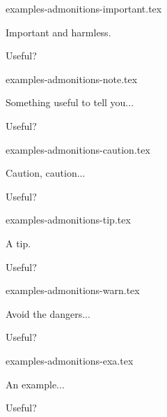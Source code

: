 \begin{filecontents*}[overwrite]{examples-admonitions-important.tex}
\begin{tdocimp}
    Important and harmless.
\end{tdocimp}

\begin{tdocimp}
    Useful?
\end{tdocimp}
\end{filecontents*}


\begin{filecontents*}[overwrite]{examples-admonitions-note.tex}
\begin{tdocnote}
    Something useful to tell you...
\end{tdocnote}

\begin{tdocnote}
    Useful?
\end{tdocnote}
\end{filecontents*}


\begin{filecontents*}[overwrite]{examples-admonitions-caution.tex}
\begin{tdoccaut}
    Caution, caution...
\end{tdoccaut}

\begin{tdoccaut}
    Useful?
\end{tdoccaut}
\end{filecontents*}


\begin{filecontents*}[overwrite]{examples-admonitions-tip.tex}
\begin{tdoctip}
    A tip.
\end{tdoctip}

\begin{tdoctip}
    Useful?
\end{tdoctip}
\end{filecontents*}


\begin{filecontents*}[overwrite]{examples-admonitions-warn.tex}
\begin{tdocwarn}
    Avoid the dangers...
\end{tdocwarn}

\begin{tdocwarn}
    Useful?
\end{tdocwarn}
\end{filecontents*}


\begin{filecontents*}[overwrite]{examples-admonitions-exa.tex}
\begin{tdocexa}
    An example...
\end{tdocexa}

\begin{tdocexa}
    Useful?
\end{tdocexa}
\end{filecontents*}


